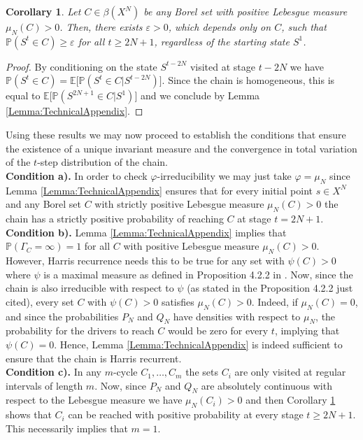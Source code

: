 \documentclass[12pt,english]{article}
\newtheorem{corollary}{Corollary}
\newcommand{\PP}{\mathbb{P}}
\begin{document}
{\begin{corollary}
\label{Cor:TechnicalAppendix}
    Let $C\in \beta(X^N)$ be any  Borel set with  positive Lebesgue measure $\mu_N(C)>0$. Then, there exists $\varepsilon>0$, which depends only on $C$, such that  $\PP(S^{t}\!\in C) \geq \varepsilon$  for  all $t\ge 2N+1$, regardless of the starting state $S^1$.
\end{corollary}
\begin{proof}
 By conditioning on the state $S^{t-2N}$ visited at stage $t-2N$ we have
$\mathbb{P}(S^t\!\in C)=\mathbb{E}\big[\mathbb{P}(S^t\!\in C|S^{t-2N})\big]$. Since the
chain is homogeneous, this is equal to
$\mathbb{E}\big[\mathbb{P}(S^{2N+1}\!\in C|S^{1})\big]$ and we conclude by  Lemma \ref{Lemma:TechnicalAppendix}.
\end{proof}
Using these results
we may now proceed to establish the conditions 
that ensure the existence of a unique invariant measure and the convergence in total variation of the $t$-step distribution of the chain.
\\[1ex]
{\bf Condition a).} 
In order to check
$\varphi$-irreducibility we may just take
$\varphi=\mu_N$ since  Lemma \ref{Lemma:TechnicalAppendix} ensures that for  every initial point $s \in X^N$ and any Borel set $C$ with strictly positive Lebesgue measure $\mu_N(C)>0$  the chain has a strictly positive probability of reaching $C$ at stage $t=2N+1$.
\\[1ex]
{\bf Condition b).} 
  Lemma \ref{Lemma:TechnicalAppendix} implies that $\mathbb{P}(\Gamma_C=\infty)=1$ for all $C$ with positive Lebesgue measure $\mu_N(C)>0$. However, Harris recurrence needs this to be true for any set with $\psi(C)>0$ where $\psi$ is a maximal measure as defined in Proposition 4.2.2 in \cite{meyn2012markov}. Now,  since the chain is also irreducible with respect to $\psi$ (as stated in the  Proposition 4.2.2 just cited), every set $C$ with $\psi(C)>0$ satisfies $\mu_N(C)>0$. Indeed, if $\mu_N(C)=0$, and since the probabilities $P_N$ and $Q_N$ have densities with respect to $\mu_N$,  the probability for the drivers to reach $C$ would be zero for every $t$, implying that $\psi(C)=0$. Hence, Lemma \ref{Lemma:TechnicalAppendix} is indeed sufficient to ensure that the chain is Harris recurrent.
\\[1ex]
{\bf Condition c).} In any $m$-cycle $C_1,\ldots, C_m$ the sets $C_i$ are only visited at regular intervals of length $m$. Now, since $P_N$ and $Q_N$ are absolutely continuous with respect to the Lebesgue measure we have $\mu_N(C_i)>0$ and then Corollary \ref{Cor:TechnicalAppendix} shows that $C_i$ can be reached with positive probability at every stage $t\geq 2N+1$. This  necessarily implies that $m=1$.
}
\end{document}
